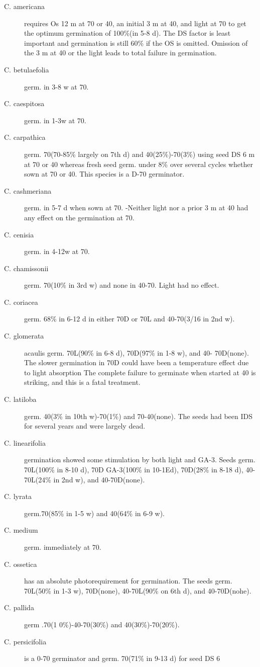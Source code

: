 \begin{description}
\item[C. americana] requires Os 12 m at 70 or 40, an initial 3 m at 40, and light at 70
to get the optimum germination of 100\%(in 5-8 d). The DS factor is least important and
germination is still 60\% if the OS is omitted. Omission of the 3 m at 40 or the light
leads to total failure in germination.
\item[C. betulaefolia] germ. in 3-8 w at 70.
\item[C. caespitosa] germ. in 1-3w at 70.
\item[C. carpathica] germ. 70(70-85\% largely on 7th d) and 40(25\%)-70(3\%) using
seed DS 6 m at 70 or 40 whereas fresh seed germ. under 8\% over several cycles
whether sown at 70 or 40. This species is a D-70 germinator.
\item[C. cashmeriana] germ. in 5-7 d when sown at 70. -Neither light nor a prior 3 m at
40 had any effect on the germination at 70.
\item[C. cenisia] germ. in 4-12w at 70.
\item[C. chamissonii] germ. 70(10\% in 3rd w) and none in 40-70. Light had no effect.
\item[C. coriacea] germ. 68\% in 6-12 d in either 70D or 70L and 40-70(3/16 in 2nd w).
\item[C. glomerata] acaulis germ. 70L(90\% in 6-8 d), 70D(97\% in 1-8 w), and 40-
70D(none). The slower germination in 70D could have been a temperature effect due
to light absorption The complete failure to germinate when started at 40 is striking,
and this is a fatal treatment.
\item[C. latiloba] germ. 40(3\% in 10th w)-70(1\%) and 70-40(none). The seeds had
been IDS for several years and were largely dead.
\item[C. linearifolia] germination showed some stimulation by both light and GA-3.
Seeds germ. 70L(100\% in 8-10 d), 70D GA-3(100\% in 10-1Ed), 70D(28\% in 8-18 d),
40-70L(24\% in 2nd w), and 40-70D(none).
\item[C. lyrata] germ.70(85\% in 1-5 w) and 40(64\% in 6-9 w).
\item[C. medium] germ. immediately at 70.
\item[C. ossetica] has an absolute photorequirement for germination. The seeds
germ. 70L(50\% in 1-3 w), 70D(none), 40-70L(90\% on 6th d), and 40-70D(nohe).
\item[C. pallida] germ .70(1 0\%)-40-70(30\%) and 40(30\%)-70(20\%).
\item[C. persicifolia] is a 0-70 germinator and germ. 70(71\% in 9-13 d) for seed DS 6

\end{description}
